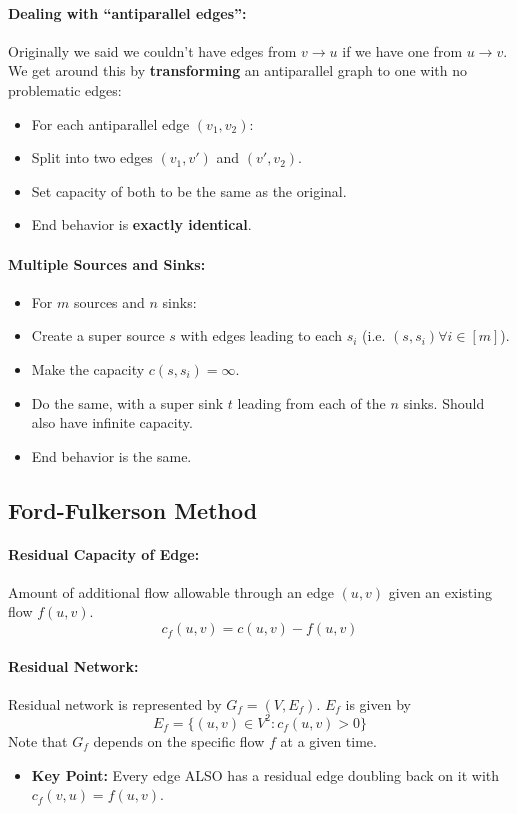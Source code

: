 \documentclass[a4paper,12pt]{report}
\begin{document}
\paragraph{Dealing with ``antiparallel edges'': } Originally we said we couldn't have edges from $v\to u$ if we have one from $u\to v$. We get around this by \textbf{transforming} an antiparallel graph to one with no problematic edges: 
\begin{itemize}
\item For each antiparallel edge $(v_1, v_2)$: 
\item Split into two edges $(v_1, v')$ and $(v', v_2)$.
\item Set capacity of both to be the same as the original.
\item End behavior is \textbf{exactly identical}.
\end{itemize}


\paragraph{Multiple Sources and Sinks: } 
\begin{itemize}
\item For $m$ sources and $n$ sinks:
\item Create a super source $s$ with edges leading to each $s_i$ (i.e. $(s,s_i) \forall i\in [m]$).
\item Make the capacity $c(s,s_i) = \infty$. 
\item Do the same, with a super sink $t$ leading from each of the $n$ sinks. Should also have infinite capacity.
\item End behavior is the same. 
\end{itemize}

\subsection{Ford-Fulkerson Method}

\paragraph{Residual Capacity of Edge: } Amount of additional flow allowable through an edge $(u,v)$ given an existing flow $f(u,v)$.
\begin{equation}
c_f(u,v) = c(u,v) - f(u,v)
\end{equation}

\paragraph{Residual Network: } Residual network is represented by $G_f = (V, E_f)$. $E_f$ is given by 
\begin{equation}
E_f = \{(u,v)\in V^2: c_f(u,v) > 0\}
\end{equation}
Note that $G_f$ depends on the specific flow $f$ at a given time. 
\begin{itemize}
\item \textbf{Key Point: } Every edge ALSO has a residual edge doubling back on it with $c_f(v,u) = f(u,v)$. 
\end{itemize}
\end{document}

